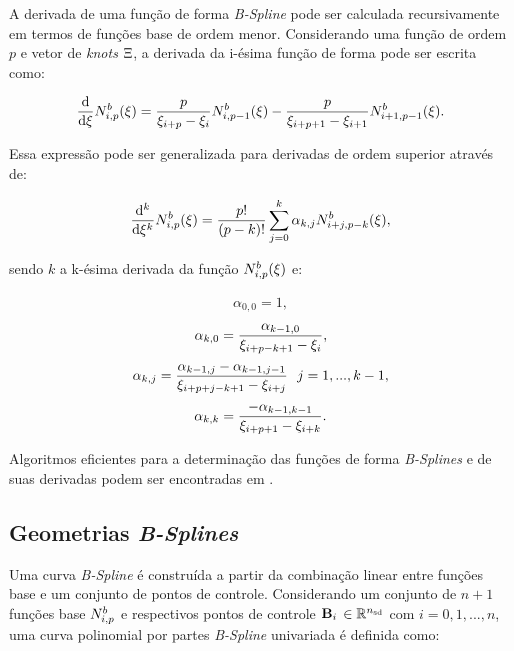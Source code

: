 \documentclass[tese_patricia]{subfiles}
\begin{document}
A derivada de uma função de forma \textit{B-Spline} pode ser calculada recursivamente em termos de funções base de ordem menor. Considerando uma função de ordem $p$ e vetor de \textit{knots} $\Xi$, a derivada da i-ésima função de forma pode ser escrita como:

\begin{align}
\frac{\mathrm{d}}{\mathrm{d} \xi} N^b_{i,p}(\xi) = \frac{p}{\xi_{i+p} - \xi_{i}}N^b_{i,p-1}(\xi) - \frac{p}{\xi_{i+p+1} - \xi_{i+1}}N^b_{i+1,p-1}(\xi).
\end{align}

Essa expressão pode ser generalizada para derivadas de ordem superior através de:

\begin{align}
	\frac{\mathrm{d}^{k}}{\mathrm{d} \xi^{k}} N^b_{i,p}(\xi) = \frac{p!}{\left(p-k\right)!} \sum_{j=0}^{k}{\alpha_{k,j}N^b_{i+j,p-k}(\xi)},
\end{align}

sendo $k$ a k-ésima derivada da função $N^b_{i,p}(\xi)$ e:

\begin{align}
	\alpha_{0,0} = 1,
\end{align}
\begin{align}
	\alpha_{k,0} = \frac{\alpha_{k-1,0}}{\xi_{i+p-k+1}-\xi_{i}},
\end{align}
\begin{align}
	\alpha_{k,j} = \frac{\alpha_{k-1,j}-\alpha_{k-1,j-1}}{\xsi_{i+p+j-k+1}-\xsi_{i+j}} \ \ j=1,...,k-1,
\end{align}
\begin{align}
	\alpha_{k,k} = \frac{-\alpha_{k-1,k-1}}{\xi_{i+p+1}-\xi_{i+k}}.
\end{align}

Algoritmos eficientes para a determinação das funções de forma \textit{B-Splines} e de suas derivadas podem ser encontradas em .

\subsection{Geometrias \textit{B-Splines}}

Uma curva \textit{B-Spline} é construída a partir da combinação linear entre funções base e um conjunto de pontos de controle. Considerando um conjunto de $n+1$ funções base $N^b_{i,p}$ e respectivos pontos de controle $\mathbf{B}_i$ $\in \mathbb{R}^{{n_{\mathrm{sd}}}}$ com $i = 0,1,...,n$,
uma curva polinomial por partes \textit{B-Spline} univariada é definida como:
\end{document}
